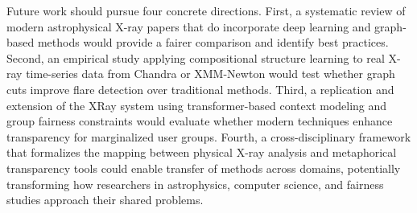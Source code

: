 \documentclass[conference]{IEEEtran}
\begin{document}
Future work should pursue four concrete directions. First, a systematic review of modern astrophysical X-ray papers that do incorporate deep learning and graph-based methods would provide a fairer comparison and identify best practices. Second, an empirical study applying compositional structure learning \cite{r4,r5} to real X-ray time-series data from Chandra or XMM-Newton would test whether graph cuts improve flare detection over traditional methods. Third, a replication and extension of the XRay system \cite{r3} using transformer-based context modeling and group fairness constraints would evaluate whether modern techniques enhance transparency for marginalized user groups. Fourth, a cross-disciplinary framework that formalizes the mapping between physical X-ray analysis and metaphorical transparency tools could enable transfer of methods across domains, potentially transforming how researchers in astrophysics, computer science, and fairness studies approach their shared problems.
\end{document}
